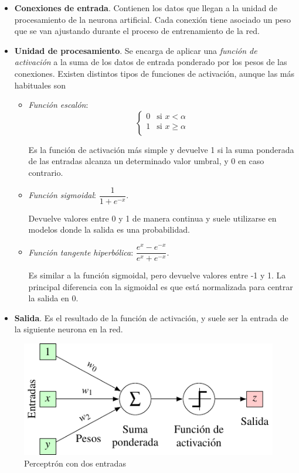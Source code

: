 \documentclass[
  a4paper,
]{scrreport}
\begin{document}
\begin{itemize}
\item
  \textbf{Conexiones de entrada}. Contienen los datos que llegan a la
  unidad de procesamiento de la neurona artificial. Cada conexión tiene
  asociado un peso que se van ajustando durante el proceso de
  entrenamiento de la red.
\item
  \textbf{Unidad de procesamiento}. Se encarga de aplicar una
  \emph{función de activación} a la suma de los datos de entrada
  ponderado por los pesos de las conexiones. Existen distintos tipos de
  funciones de activación, aunque las más habituales son

  \begin{itemize}
  \item
    \emph{Función escalón}: \[
      \begin{cases}
      0 & \text{si } x < \alpha \\
      1 & \text{si } x \geq \alpha\\
      \end{cases} 
      \]

    Es la función de activación más simple y devuelve 1 si la suma
    ponderada de las entradas alcanza un determinado valor umbral, y 0
    en caso contrario.
  \item
    \emph{Función sigmoidal}: \(\dfrac{1}{1+e^{-x}}\).

    Devuelve valores entre 0 y 1 de manera continua y suele utilizarse
    en modelos donde la salida es una probabilidad.
  \item
    \emph{Función tangente hiperbólica}:
    \(\dfrac{e^x-e^{-x}}{e^x+e^{-x}}\).

    Es similar a la función sigmoidal, pero devuelve valores entre -1 y
    1. La principal diferencia con la sigmoidal es que está normalizada
    para centrar la salida en 0.
  \end{itemize}
\item
  \textbf{Salida}. Es el resultado de la función de activación, y suele
  ser la entrada de la siguiente neurona en la red.
\end{itemize}

\begin{figure}[H]

{\centering \includegraphics{img/perceptron/perceptron.pdf}

}

\caption{Perceptrón con dos entradas}

\end{figure}%
\end{document}
